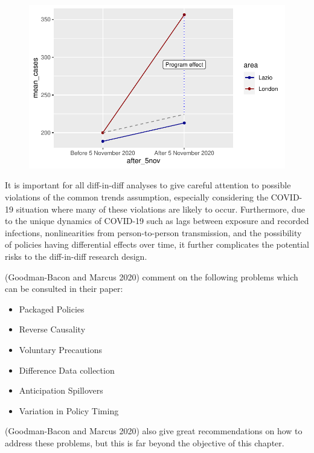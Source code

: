 \documentclass[
  letterpaper,
  DIV=11,
  numbers=noendperiod]{scrreprt}
\begin{document}
\begin{figure}[H]

{\centering \includegraphics{longitudinal-2_files/figure-pdf/unnamed-chunk-17-1.pdf}

}

\end{figure}

It is important for all diff-in-diff analyses to give careful attention
to possible violations of the common trends assumption, especially
considering the COVID-19 situation where many of these violations are
likely to occur. Furthermore, due to the unique dynamics of COVID-19
such as lags between exposure and recorded infections, nonlinearities
from person-to-person transmission, and the possibility of policies
having differential effects over time, it further complicates the
potential risks to the diff-in-diff research design.

(Goodman-Bacon and Marcus 2020) comment on the following problems which
can be consulted in their paper:

\begin{itemize}
\item
  Packaged Policies
\item
  Reverse Causality
\item
  Voluntary Precautions
\item
  Difference Data collection
\item
  Anticipation Spillovers
\item
  Variation in Policy Timing
\end{itemize}

(Goodman-Bacon and Marcus 2020) also give great recommendations on how
to address these problems, but this is far beyond the objective of this
chapter.
\end{document}
